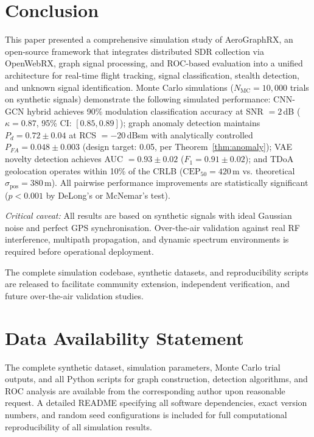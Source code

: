 \documentclass[sensors,article,submit,pdftex]{mdpi}
\begin{document}
\section{Conclusion}
\label{sec:conclusion}

This paper presented a comprehensive simulation study of AeroGraphRX, an open-source framework that integrates distributed SDR collection via OpenWebRX, graph signal processing, and ROC-based evaluation into a unified architecture for real-time flight tracking, signal classification, stealth detection, and unknown signal identification. Monte Carlo simulations ($N_{\text{MC}} = 10{,}000$ trials on synthetic signals) demonstrate the following simulated performance: CNN-GCN hybrid achieves 90\% modulation classification accuracy at SNR $= 2$\,dB ($\kappa = 0.87$, 95\% CI: $[0.85, 0.89]$); graph anomaly detection maintains $P_d = 0.72 \pm 0.04$ at RCS $= -20$\,dBsm with analytically controlled $P_{FA} = 0.048 \pm 0.003$ (design target: 0.05, per Theorem~\ref{thm:anomaly}); VAE novelty detection achieves AUC $= 0.93 \pm 0.02$ ($F_1 = 0.91 \pm 0.02$); and TDoA geolocation operates within 10\% of the CRLB ($\text{CEP}_{50} = 420$\,m vs. theoretical $\sigma_{\text{pos}} = 380$\,m). All pairwise performance improvements are statistically significant ($p < 0.001$ by DeLong's or McNemar's test).

\textit{Critical caveat:} All results are based on synthetic signals with ideal Gaussian noise and perfect GPS synchronisation. Over-the-air validation against real RF interference, multipath propagation, and dynamic spectrum environments is required before operational deployment.

The complete simulation codebase, synthetic datasets, and reproducibility scripts are released to facilitate community extension, independent verification, and future over-the-air validation studies.

\section*{Data Availability Statement}
The complete synthetic dataset, simulation parameters, Monte Carlo trial outputs, and all Python scripts for graph construction, detection algorithms, and ROC analysis are available from the corresponding author upon reasonable request. A detailed README specifying all software dependencies, exact version numbers, and random seed configurations is included for full computational reproducibility of all simulation results.
\end{document}
